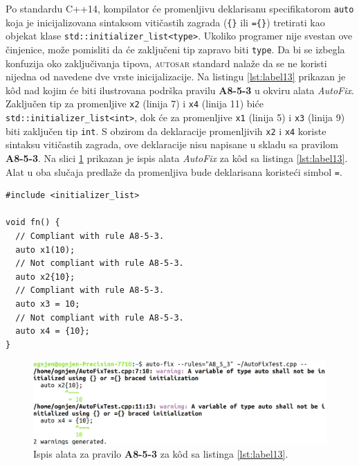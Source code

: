 \documentclass[12pt,oneside]{memoir}
\begin{document}
Po standardu C++14, kompilator \'{c}e  promenljivu deklarisanu specifikatorom \texttt{auto} koja je inicijalizovana sintaksom viti\v{c}astih zagrada (\texttt{\{\}} ili \texttt{=\{\}}) tretirati kao objekat klase
\texttt{std::initializer\_list<type>}. Ukoliko programer nije svestan ove \v{c}injenice, mo\v{z}e pomisliti da \'{c}e zaklju\v{c}eni tip zapravo biti \texttt{type}. Da bi se izbegla konfuzija oko zaklju\v{c}ivanja
tipova, \textsc{autosar} standard nala\v{z}e da se ne koristi nijedna od navedene dve vrste inicijalizacije.
Na listingu \ref{lst:label13} prikazan je k\^{o}d nad kojim \'{c}e biti ilustrovana podr\v{s}ka pravilu \textbf{A8-5-3} u okviru alata \textit{AutoFix}. 
Zaklju\v{c}en tip za promenljive \texttt{x2} (linija 7) i \texttt{x4} (linija 11) bi\'c{e} \texttt{std::initializer\_list<int>}, dok \'{c}e za promenljive \texttt{x1} (linija 5) i \texttt{x3} (linija 9) biti zaklju\v{c}en tip \texttt{int}. S obzirom da deklaracije promenljivih \texttt{x2} i \texttt{x4} koriste sintaksu
viti\v{c}astih zagrada, ove deklaracije nisu napisane u skladu sa pravilom \textbf{A8-5-3}.
Na slici \ref{fig:A8-5-3} prikazan je ispis alata \textit{AutoFix} za k\^{o}d sa listinga \ref{lst:label13}. Alat u oba slu\v{c}aja predla\v{z}e
da promenljiva bude deklarisana koriste\'{c}i simbol \texttt{=}.

\begin{lstlisting}[style=customc, caption={K\^{o}d nad kojim je demonstrirana podr\v{s}ka pravilu \textbf{A8-5-3} u okviru alata \textit{AutoFix}. Ispis alata \textit{AutoFix} nakon pokretanja nad ovim kodom prikazan je na slici \ref{fig:A8-5-3}.}, label=lst:label13]
#include <initializer_list>

void fn() {
  // Compliant with rule A8-5-3.
  auto x1(10);
  // Not compliant with rule A8-5-3.
  auto x2{10};
  // Compliant with rule A8-5-3.
  auto x3 = 10;
  // Not compliant with rule A8-5-3.
  auto x4 = {10};
}

\end{lstlisting}

\begin{figure}[!h]
\begin{center}
\includegraphics[scale=0.22]{A8_5_3.png}
\end{center}
\caption{Ispis alata za pravilo \textbf{A8-5-3} za k\^{o}d sa listinga \ref{lst:label13}.}
\label{fig:A8-5-3}
\end{figure}
\end{document}
